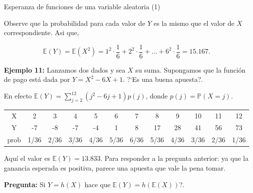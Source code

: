 \documentclass[10pt]{beamer}
\begin{document}
\begin{frame}{Esperanza de funciones de una variable aleatoria (1)}

\small{Observe que la probabilidad para cada valor de $Y$ es la mismo que el  valor de $X$ correspondiente. Asi que,

\[
\mathbb{E}(Y) = \mathbb{E}{(X^2)} = 1^2\cdot \frac{1}{6} + 2^2\cdot\frac{1}{6} + \dots + 6^2\cdot \frac{1}{6} = 15.167.
\]

\vspace{0.2cm}

 \textbf{Ejemplo 11: } Lanzamos dos dados y sea $X$ su suma. Supongamos que la función de pago est\'a dada por $Y = X^2 - 6X + 1$. ?`Es una buena apuesta?.}
	
\scriptsize{En efecto $\mathbb{E}(Y) = \displaystyle\sum_{j =2}^{12}(j^2 -6j + 1)p(j)$, donde $p(j) = \mathbb{P}(X= j)$.

\begin{table}[]
	\centering
	\begin{tabular}{cccccccccccc}
		X    & 2    & 3    & 4    & 5    & 6    & 7    & 8    & 9    & 10   & 11   & 12   \\
		Y    & -7   & -8   & -7   & -4   & 1    & 8    & 17   & 28   & 41   & 56   & 73   \\
		prob & 1/36 & 2/36 & 3/36 & 4/36 & 5/36 & 6/36 & 5/36 & 4/36 & 3/36 & 2/36 & 1/36
	\end{tabular}
\end{table}

Aqu\'i el valor es $\mathbb{E}(Y) = 13.833$.  Para responder a la pregunta anterior: ya que la ganancia esperada es positiva, parece una apuesta que vale la pena tomar.	
}

\small{\textbf{Pregunta:}} Si $Y = h(X)$ hace que $\mathbb{E}(Y) = h(\mathbb{E}(X))$?.
\end{frame}
\end{document}
